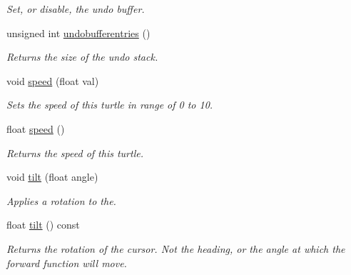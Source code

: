 \begin{DoxyCompactItemize}
\begin{DoxyCompactList}\small\item\em Set, or disable, the undo buffer. \end{DoxyCompactList}\item 
\mbox{\label{classcturtle_1_1Turtle_ae7fd2fb0ac04dea930d6411f87229dfa}} 
unsigned int \hyperlink{classcturtle_1_1Turtle_ae7fd2fb0ac04dea930d6411f87229dfa}{undobufferentries} ()
\begin{DoxyCompactList}\small\item\em Returns the size of the undo stack. \end{DoxyCompactList}\item 
void \hyperlink{classcturtle_1_1Turtle_a5f2010373aeb82207975e9f1b4168747}{speed} (float val)
\begin{DoxyCompactList}\small\item\em Sets the speed of this turtle in range of 0 to 10. \end{DoxyCompactList}\item 
\mbox{\label{classcturtle_1_1Turtle_af018ea1fa9eb9be80fdf53fabcb668eb}} 
float \hyperlink{classcturtle_1_1Turtle_af018ea1fa9eb9be80fdf53fabcb668eb}{speed} ()
\begin{DoxyCompactList}\small\item\em Returns the speed of this turtle. \end{DoxyCompactList}\item 
\mbox{\label{classcturtle_1_1Turtle_ae3e48f309eaea7b4426ad1a173f15ef5}} 
void \hyperlink{classcturtle_1_1Turtle_ae3e48f309eaea7b4426ad1a173f15ef5}{tilt} (float angle)
\begin{DoxyCompactList}\small\item\em Applies a rotation to the. \end{DoxyCompactList}\item 
\mbox{\label{classcturtle_1_1Turtle_aec48e043d9f3a259d7500d94323d6890}} 
float \hyperlink{classcturtle_1_1Turtle_aec48e043d9f3a259d7500d94323d6890}{tilt} () const
\begin{DoxyCompactList}\small\item\em Returns the rotation of the cursor. Not the heading, or the angle at which the forward function will move. \end{DoxyCompactList}\item 

\end{DoxyCompactItemize}
